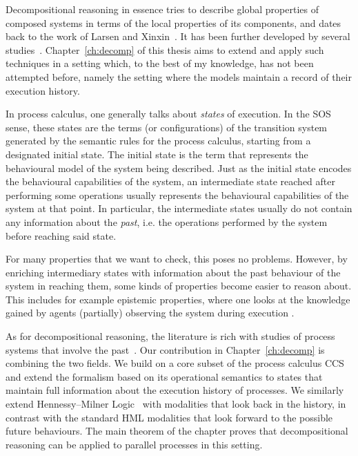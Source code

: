 Decompositional reasoning in essence tries to describe global properties of
composed systems in terms of the local properties of its components, 
and dates back to the work of Larsen and Xinxin~\cite{Larsen91}.
It has been further developed by several studies~\cite{Giannakopoulou05,Xie05,Andersen95,LaroussinieL95}.
Chapter~\ref{ch:decomp} of this thesis aims to extend and apply such techniques
in a setting which, to the best of my knowledge, has not been attempted before,
namely the setting where the models maintain a record of their execution history.

\vspace{1em}

In process calculus, one generally talks about \emph{states} of execution. In the
SOS sense, these states are the terms (or configurations) of the transition system
generated by the semantic rules for the process calculus, starting from a designated
initial state. The initial state is the term that represents the behavioural model
of the system being described. Just as the initial state encodes the behavioural
capabilities of the system, an intermediate state reached after performing some
operations usually represents the behavioural capabilities of the system at that point.
In particular, the intermediate states usually do not contain any information about
the \emph{past}, i.e. the operations performed by the system before reaching said state.

For many properties that we want to check, this poses no problems. However,
by enriching intermediary states with information about the past behaviour of 
the system in reaching them, some kinds of properties become easier to reason
about. This includes for example epistemic properties, where one looks at the
knowledge gained by agents (partially) observing the system during execution
\cite{Mousavi07-LPAR}.

As for decompositional reasoning, the literature is rich with studies of process systems
that involve the past~\cite{HennessyS85,Phillips06,Laroussinie00,DeNicola:1990}.
Our contribution in Chapter~\ref{ch:decomp} is combining the two fields. We build
on a core subset of the process calculus CCS~\cite{Milner80} and extend
the formalism based on its operational semantics to states that maintain full
information about the execution history of processes. We similarly extend Hennessy--Milner
Logic~\cite{HennessyM80} with modalities that look back in the history, 
in contrast with the standard HML modalities that look forward to the possible
future behaviours.
The main theorem of the chapter
proves that decompositional reasoning can be applied to parallel processes in this
setting.

